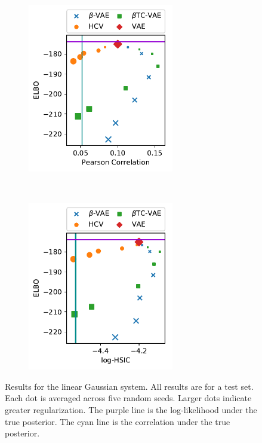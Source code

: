 \begin{figure}[ht]
\captionsetup[subfigure]{justification=centering}
    \centering  
    \begin{subfigure}[t]{0.5\textwidth}
        \centering   
		\includegraphics[width=0.7\textwidth]{figures/gaussian.pdf}
    \end{subfigure}%
    ~  
    \begin{subfigure}[t]{0.5\textwidth}
        \centering  
		\includegraphics[width=0.7\textwidth]{figures/gaussian_hsic.pdf}
    \end{subfigure}

    \caption[Results for the linear Gaussian system]{Results for the linear Gaussian system. All results are for a test set. Each dot is averaged across five random seeds. Larger dots indicate greater regularization. The purple line is the log-likelihood under the true posterior. The cyan line is the correlation under the true posterior.}
    \label{hsiclingaussfigure}
\end{figure}